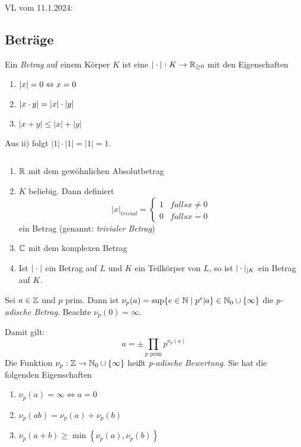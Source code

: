 \documentclass[../main.tex]{subfiles}
\begin{document}
\begin{flushright}
VL vom 11.1.2024:
\end{flushright}
\subsection{Beträge}
\begin{definition} %
    Ein \emph{Betrag} auf einem Körper $K$ ist eine $|\cdot|: K\rightarrow \mathbb{R}_{\geq0}$ mit den Eigenschaften
    \begin{enumerate}[label=\roman*)]
        \item $\left\vert x \right\vert = 0 \Leftrightarrow x =0$
        \item $\left\vert x\cdot y \right\vert = |x| \cdot |y|$
        \item $|x+y| \leq |x| + |y|$
    \end{enumerate}
    Aus ii) folgt $|1|\cdot |1| =|1| = 1$.
\end{definition}
\begin{example}$ $
    \begin{enumerate}[label=\roman*)] %
        \item $\mathbb{R}$ mit dem gewöhnlichen Absolutbetrag
        \item $K$ beliebig. Dann definiert 
        $$|x|_{trivial} = \begin{cases}
            1 & falls x\neq 0\\
            0 & falls x= 0
        \end{cases}$$
        ein Betrag (genannt: \emph{trivialer Betrag})
        \item $\mathbb{C}$ mit dem komplexen Betrag
        \item Ist $|\cdot|$ ein Betrag auf $L$ und $K$ ein Teilkörper von $L$, so ist $|\cdot|_{|K}$ ein Betrag auf $K$.
    \end{enumerate}
\end{example}
\begin{definition} 
    Sei $a\in \mathbb{Z}$ und $p$ prim. Dann ist
    $\nu_p(a)= \sup\{e\in \mathbb{N}\mid p^e|a\}\in \mathbb{N}_0\cup \{\infty\}$
    die \emph{p-adische Betrag}.
Beachte $\nu_p(0) = \infty$.
\end{definition}
Damit gilt:
$$a = \pm \prod_{p\text{ prim}} p^{\nu_p(a)}$$
Die Funktion $\nu_p:\mathbb{Z}\rightarrow \mathbb{N}_0\cup \{\infty\}$ heißt \emph{p-adische Bewertung}. Sie hat die folgenden Eigenschaften
\begin{enumerate}[label=\roman*)]%
    \item $\nu_p(a) = \infty \Leftrightarrow a = 0$
    \item $\nu_p(ab) = \nu_p(a)+\nu_p(b)$
    \item $\nu_p(a+b) \geq \min\left\{\nu_p(a),\nu_p(b)\right\}$
\end{enumerate}
\end{document}
